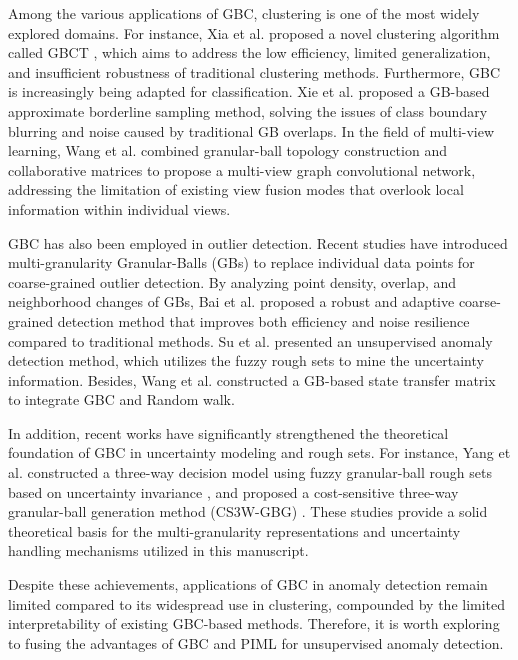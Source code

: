 \documentclass[times, review, 10pt]{elsarticle}
\begin{document}
Among the various applications of GBC, clustering is one of the most widely explored domains.
For instance, Xia et al. proposed a novel clustering algorithm called GBCT \cite{xia2025gbct}, which aims to address the low efficiency, limited generalization, and insufficient robustness of traditional clustering methods. 
{Furthermore, GBC is increasingly being adapted for classification. Xie et al. \cite{xie2025approximate} proposed a GB-based approximate borderline sampling method, solving the issues of class boundary blurring and noise caused by traditional GB overlaps. In the field of multi-view learning, Wang et al. \cite{wang2025capturing} combined granular-ball topology construction and collaborative matrices to propose a multi-view graph convolutional network, addressing the limitation of existing view fusion modes that overlook local information within individual views.}


GBC has also been employed in outlier detection. Recent studies have introduced multi-granularity Granular-Balls (GBs) to replace individual data points for coarse-grained outlier detection. By analyzing point density, overlap, and neighborhood changes of GBs, Bai et al. \cite{bai2023granular} proposed a robust and adaptive coarse-grained detection method that improves both efficiency and noise resilience compared to traditional methods. Su et al. \cite{su2024detecting} presented an unsupervised anomaly detection method, which utilizes the fuzzy rough sets to mine the uncertainty information. Besides, Wang et al. \cite{wang2025granular} constructed a GB-based state transfer matrix to integrate GBC and Random walk.

{In addition}, recent works have significantly strengthened the theoretical foundation of GBC in uncertainty modeling and rough sets. For instance, Yang et al. constructed a three-way decision model using fuzzy granular-ball rough sets based on uncertainty invariance \cite{yang2025constructing}, and proposed a cost-sensitive three-way granular-ball generation method (CS3W-GBG) \cite{yang2025cs3w}. These studies provide a solid theoretical basis for the multi-granularity representations and uncertainty handling mechanisms utilized in this manuscript.

{Despite these achievements, applications of GBC in anomaly detection remain limited compared to its widespread use in clustering, compounded by the limited interpretability of existing GBC-based methods.} Therefore, it is worth exploring to fusing the advantages of GBC and PIML for unsupervised anomaly detection.
\end{document}
